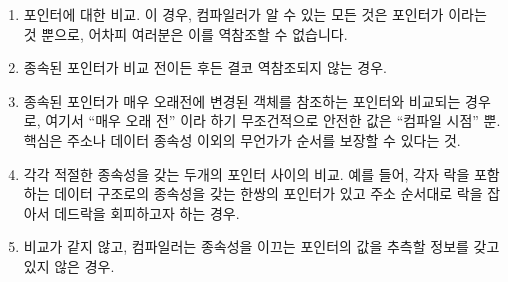 \fi

\begin{enumerate}
\item	{} 포인터에 대한 비교.
	이 경우, 컴파일러가 알 수 있는 모든 것은 포인터가  이라는
	것 뿐으로, 어차피 여러분은 이를 역참조할 수 없습니다.
\item	종속된 포인터가 비교 전이든 후든 결코 역참조되지 않는 경우.
\item	종속된 포인터가 매우 오래전에 변경된 객체를 참조하는 포인터와 비교되는
	경우로, 여기서 ``매우 오래 전'' 이라 하기 무조건적으로 안전한 값은
	``컴파일 시점'' 뿐.
	핵심은 주소나 데이터 종속성 이외의 무언가가 순서를 보장할 수 있다는 것.
\item	각각 적절한 종속성을 갖는 두개의 포인터 사이의 비교.
	예를 들어, 각자 락을 포함하는 데이터 구조로의 종속성을 갖는 한쌍의
	포인터가 있고 주소 순서대로 락을 잡아서 데드락을 회피하고자 하는 경우.
\item	비교가 같지 않고, 컴파일러는 종속성을 이끄는 포인터의 값을 추측할
	정보를 갖고 있지 않은 경우.

\end{enumerate}

